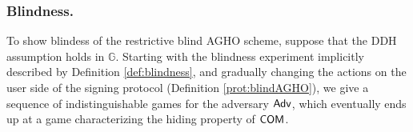 \subsubsection{Blindness.}
To show blindess of the restrictive  blind AGHO scheme, suppose that the DDH assumption holds in $\mathbb G$.
Starting with the blindness experiment implicitly described by Definition \ref{def:blindness}, 
 and gradually changing the actions on the user side of the signing protocol (Definition \ref{prot:blindAGHO}), we give a sequence of indistinguishable games for the adversary $\mathsf{Adv}$, which eventually ends up at a game characterizing the hiding property of $\operatorname{\mathsf{COM}}$.

